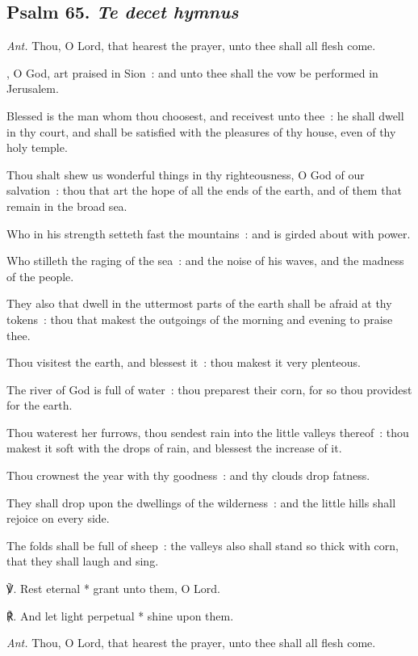 \subsection{Psalm 65. \textit{Te decet hymnus}}\par\noindent
\textit{Ant.} Thou, O Lord, {\dag} that hearest the prayer, unto thee shall all flesh come.\par
{}, O God, art praised in Sion~: and unto thee shall the vow be performed in Jerusalem.\par
{}
Blessed is the man whom thou choosest, and receivest unto thee~: he shall dwell in thy court, and shall be satisfied with the pleasures of thy house, even of thy holy temple.\par
{}Thou shalt shew us wonderful things in thy righteousness, O God of our salvation~: thou that art the hope of all the ends of the earth, and of them that remain in the broad sea.\par
{}Who in his strength setteth fast the mountains~: and is girded about with power.\par
{}Who stilleth the raging of the sea~: and the noise of his waves, and the madness of the people.\par
{}They also that dwell in the uttermost parts of the earth shall be afraid at thy tokens~: thou that makest the outgoings of the morning and evening to praise thee.\par
{}Thou visitest the earth, and blessest it~: thou makest it very plenteous.\par
{}The river of God is full of water~: thou preparest their corn, for so thou providest for the earth.\par
{}Thou waterest her furrows, thou sendest rain into the little valleys thereof~: thou makest it soft with the drops of rain, and blessest the increase of it.\par
{}Thou crownest the year with thy goodness~: and thy clouds drop fatness.\par
{}They shall drop upon the dwellings of the wilderness~: and the little hills shall rejoice on every side.\par
{}The folds shall be full of sheep~: the valleys also shall stand so thick with corn, that they shall laugh and sing.\par
℣. Rest eternal * grant unto them, O Lord.\par
℟. And let light perpetual * shine upon them.\par\noindent
\textit{Ant.} Thou, O Lord, that hearest the prayer, unto thee shall all flesh come.


